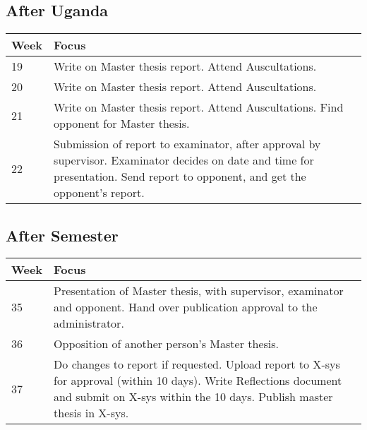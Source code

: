 \subsection{After Uganda}
\begin{center}
    \begin{tabular}{ | l | p{10cm} |}
    \hline
    Week & Focus \\ \hline
    19 & Write on Master thesis report. Attend Auscultations. \\ \hline
    20 & Write on Master thesis report. Attend Auscultations. \\ \hline
    21 & Write on Master thesis report. Attend Auscultations. Find opponent for Master thesis. \\ \hline
    22 & Submission of report to examinator, after approval by supervisor. Examinator decides on date and time for presentation. Send report to opponent, and get the opponent's report. \\ \hline
    \end{tabular}
\end{center}

\subsection{After Semester}

\begin{center}
    \begin{tabular}{ | l | p{10cm} |}
    \hline
    Week & Focus \\ \hline
    35 & Presentation of Master thesis, with supervisor, examinator and opponent. Hand over publication approval to the administrator. \\ \hline
    36 & Opposition of another person's Master thesis. \\ \hline
    37 & Do changes to report if requested. Upload report to X-sys for approval (within 10 days). Write Reflections document and submit on X-sys within the 10 days. Publish master thesis in X-sys. \\ \hline
    \end{tabular}
\end{center}
